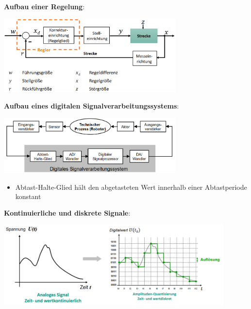 \textbf{Aufbau einer Regelung}:
\begin{center}
	\includegraphics[width=0.7\textwidth]{images/regler-aufbau.png}
\end{center}
\bigskip
\textbf{Aufbau eines digitalen Signalverarbeitungssystems}:
\begin{center}
	\includegraphics[width=0.7\textwidth]{images/signalverarbeitungssystem.png}
\end{center}
\begin{itemize}
	\item Abtast-Halte-Glied hält den abgetasteten Wert innerhalb einer Abtastperiode konstant
\end{itemize}
\bigskip
\textbf{Kontinuierliche und diskrete Signale}:
\begin{center}
	\includegraphics[width=0.9\textwidth]{images/ad.png}
\end{center}

